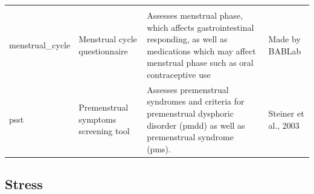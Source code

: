 \documentclass[]{book}
\begin{document}
\begin{longtable}[]{@{}llll@{}}
\begin{minipage}[t]{0.18\columnwidth}
\end{minipage}\tabularnewline
\begin{minipage}[t]{0.22\columnwidth}\raggedright
menstrual\_cycle\strut
\end{minipage} & \begin{minipage}[t]{0.27\columnwidth}\raggedright
Menstrual cycle questionnaire\strut
\end{minipage} & \begin{minipage}[t]{0.22\columnwidth}\raggedright
Assesses menstrual phase, which affects gastrointestinal responding, as well as medications which may affect menstrual phase such as oral contraceptive use\strut
\end{minipage} & \begin{minipage}[t]{0.18\columnwidth}\raggedright
Made by BABLab\strut
\end{minipage}\tabularnewline
\begin{minipage}[t]{0.22\columnwidth}\raggedright
psst\strut
\end{minipage} & \begin{minipage}[t]{0.27\columnwidth}\raggedright
Premenstrual symptoms screening tool\strut
\end{minipage} & \begin{minipage}[t]{0.22\columnwidth}\raggedright
Assesses premenstrual syndromes and criteria for premenstrual dysphoric disorder (pmdd) as well as premenstrual syndrome (pms).\strut
\end{minipage} & \begin{minipage}[t]{0.18\columnwidth}\raggedright
Steiner et al., 2003\strut
\end{minipage}\tabularnewline
\bottomrule
\end{longtable}

\hypertarget{stress}{%
\subsection{Stress}\label{stress}}
\end{document}
